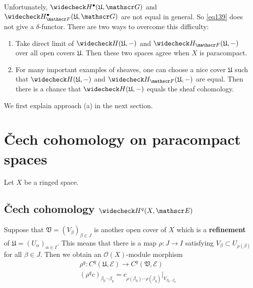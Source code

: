 \documentclass[12pt,b5paper,notitlepage]{report}
\theoremstyle{definition}
\theoremstyle{plain}
\newcommand{\fk}{\mathfrak}
\newcommand{\wch}{\widecheck}
\newcommand{\scr}{\mathscr}
\newcommand{\blt}{\bullet}
\newcommand{\Rbb}{\mathbb R}
\numberwithin{equation}{section}
\begin{document}
Unfortunately, $\wch H^\blt(\fk U,\scr G)$ and $\wch H^\blt_{\scr F}(\fk U,\scr G)$ are not equal in general. So \eqref{eq139} does not give a $\delta$-functor. There are two ways to overcome this difficulty: 
\begin{enumerate}[label=(\alph*)]
\item Take direct limit of $\wch H(\fk U,-)$ and $\wch H_{\scr F}(\fk U,-)$ over all open covers $\fk U$. Then these two spaces agree when $X$ is paracompact.
\item For many important examples of sheaves, one can choose a nice cover $\fk U$ such that $\wch H(\fk U,-)$ and $\wch H_{\scr F}(\fk U,-)$ are equal. Then there is a chance that $\wch H(\fk U,-)$ equals the sheaf cohomology.
\end{enumerate}





We first explain approach (a) in the next section.





\section{\v Cech cohomology on paracompact spaces}


Let $X$ be a ringed space.


\subsection{\v Cech cohomology $\wch H^q(X,\scr E)$}



Suppose that $\fk V=(V_\beta)_{\beta\in J}$ is another open cover of $X$ which is a \textbf{refinement} of $\fk U=(U_\alpha)_{\alpha\in I}$.  This means that there is a map $\rho:J\rightarrow I$ satisfying $V_\beta\subset U_{\rho(\beta)}$ for all $\beta\in J$. Then we obtain an $\scr O(X)$-module morphism
\begin{gather}
\rho^q:C^q(\fk U,\scr E)\rightarrow C^q(\fk V,\scr E) \nonumber\\
(\rho^q c)_{\beta_0\cdots\beta_q}=c_{\rho(\beta_0)\cdots\rho(\beta_q)}|_{V_{\beta_0\cdots\beta_q}}  \label{eq147}
\end{gather}
\end{document}
